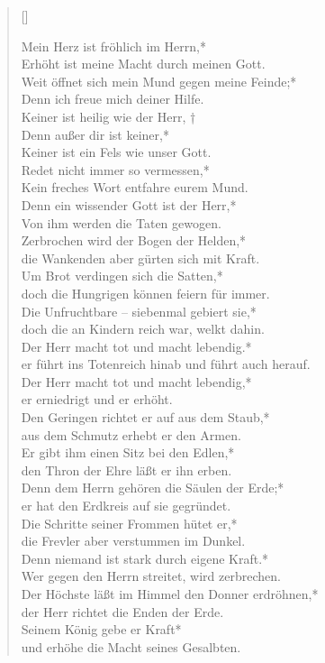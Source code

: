 \begin{verse}[\versewidth]

 Mein Herz ist fröhlich im Herrn,*\\
Erhöht ist meine Macht durch meinen Gott.\\
\vin Weit öffnet sich mein Mund gegen meine Feinde;*\\
\vin Denn ich freue mich deiner Hilfe.\\
Keiner ist heilig wie der Herr, †\\
Denn außer dir ist keiner,*\\
Keiner ist ein Fels wie unser Gott.\\
\vin Redet nicht immer so vermessen,*\\
\vin Kein freches Wort entfahre eurem Mund.\\
Denn ein wissender Gott ist der Herr,*\\
Von ihm werden die Taten gewogen.\\

\vin Zerbrochen wird der Bogen der Helden,*\\
\vin die Wankenden aber gürten sich mit Kraft.\\
Um Brot verdingen sich die Satten,*\\
doch die Hungrigen können feiern für immer.\\
\vin Die Unfruchtbare – siebenmal gebiert sie,*\\
\vin doch die an Kindern reich war, welkt dahin.\\
Der Herr macht tot und macht lebendig.*\\
er führt ins Totenreich hinab und führt auch herauf.\\
\vin Der Herr macht tot und macht lebendig,*\\
\vin er erniedrigt und er erhöht.\\
Den Geringen richtet er auf aus dem Staub,*\\
aus dem Schmutz erhebt er den Armen.\\ 
\vin Er gibt ihm einen Sitz bei den Edlen,*\\
\vin den Thron der Ehre läßt er ihn erben.\\
Denn dem Herrn gehören die Säulen der Erde;*\\
er hat den Erdkreis auf sie gegründet.\\
\vin Die Schritte seiner Frommen hütet er,*\\
die Frevler aber verstummen im Dunkel.\\
Denn niemand ist stark durch eigene Kraft.*\\
\vin Wer gegen den Herrn streitet, wird zerbrechen.\\
\vin Der Höchste läßt im Himmel den Donner erdröhnen,*\\
der Herr richtet die Enden der Erde.\\
Seinem König gebe er Kraft*\\
und erhöhe die Macht seines Gesalbten.\\
\end{verse}


